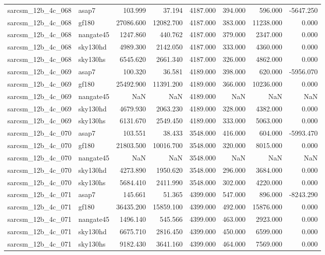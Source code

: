 \begin{tabular}{llrrrrrr}
sarcsm\_12b\_4c\_068 & asap7 & 103.999 & 37.194 & 4187.000 & 394.000 & 596.000 & -5647.250 \\
sarcsm\_12b\_4c\_068 & gf180 & 27086.600 & 12082.700 & 4187.000 & 383.000 & 11238.000 & 0.000 \\
sarcsm\_12b\_4c\_068 & nangate45 & 1247.860 & 440.762 & 4187.000 & 379.000 & 2347.000 & 0.000 \\
sarcsm\_12b\_4c\_068 & sky130hd & 4989.300 & 2142.050 & 4187.000 & 333.000 & 4360.000 & 0.000 \\
sarcsm\_12b\_4c\_068 & sky130hs & 6545.620 & 2661.340 & 4187.000 & 326.000 & 4862.000 & 0.000 \\
sarcsm\_12b\_4c\_069 & asap7 & 100.320 & 36.581 & 4189.000 & 398.000 & 620.000 & -5956.070 \\
sarcsm\_12b\_4c\_069 & gf180 & 25492.900 & 11391.200 & 4189.000 & 366.000 & 10236.000 & 0.000 \\
sarcsm\_12b\_4c\_069 & nangate45 & NaN & NaN & 4189.000 & NaN & NaN & NaN \\
sarcsm\_12b\_4c\_069 & sky130hd & 4679.930 & 2063.230 & 4189.000 & 328.000 & 4382.000 & 0.000 \\
sarcsm\_12b\_4c\_069 & sky130hs & 6131.670 & 2549.450 & 4189.000 & 333.000 & 5063.000 & 0.000 \\
sarcsm\_12b\_4c\_070 & asap7 & 103.551 & 38.433 & 3548.000 & 416.000 & 604.000 & -5993.470 \\
sarcsm\_12b\_4c\_070 & gf180 & 21803.500 & 10016.700 & 3548.000 & 320.000 & 8015.000 & 0.000 \\
sarcsm\_12b\_4c\_070 & nangate45 & NaN & NaN & 3548.000 & NaN & NaN & NaN \\
sarcsm\_12b\_4c\_070 & sky130hd & 4273.890 & 1950.620 & 3548.000 & 296.000 & 3684.000 & 0.000 \\
sarcsm\_12b\_4c\_070 & sky130hs & 5684.410 & 2411.990 & 3548.000 & 302.000 & 4220.000 & 0.000 \\
sarcsm\_12b\_4c\_071 & asap7 & 145.661 & 51.365 & 4399.000 & 547.000 & 896.000 & -8243.290 \\
sarcsm\_12b\_4c\_071 & gf180 & 36435.200 & 15859.100 & 4399.000 & 492.000 & 15876.000 & 0.000 \\
sarcsm\_12b\_4c\_071 & nangate45 & 1496.140 & 545.566 & 4399.000 & 463.000 & 2923.000 & 0.000 \\
sarcsm\_12b\_4c\_071 & sky130hd & 6675.710 & 2816.450 & 4399.000 & 450.000 & 6599.000 & 0.000 \\
sarcsm\_12b\_4c\_071 & sky130hs & 9182.430 & 3641.160 & 4399.000 & 464.000 & 7569.000 & 0.000 \\

\end{tabular}
